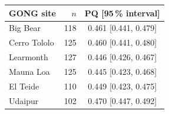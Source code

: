     \begin{tabular}{lrc}
        \toprule
        GONG site & $n$ & PQ [95\,\% interval] \\
        \midrule
        Big Bear & 118 & 0.461 [0.441, 0.479] \\
        Cerro Tololo & 125 & 0.460 [0.441, 0.480] \\
        Learmonth & 127 & 0.446 [0.426, 0.467] \\
        Mauna Loa & 125 & 0.445 [0.423, 0.468] \\
        El Teide & 110 & 0.449 [0.423, 0.475] \\
        Udaipur & 102 & 0.470 [0.447, 0.492] \\
        \bottomrule
    \end{tabular}
